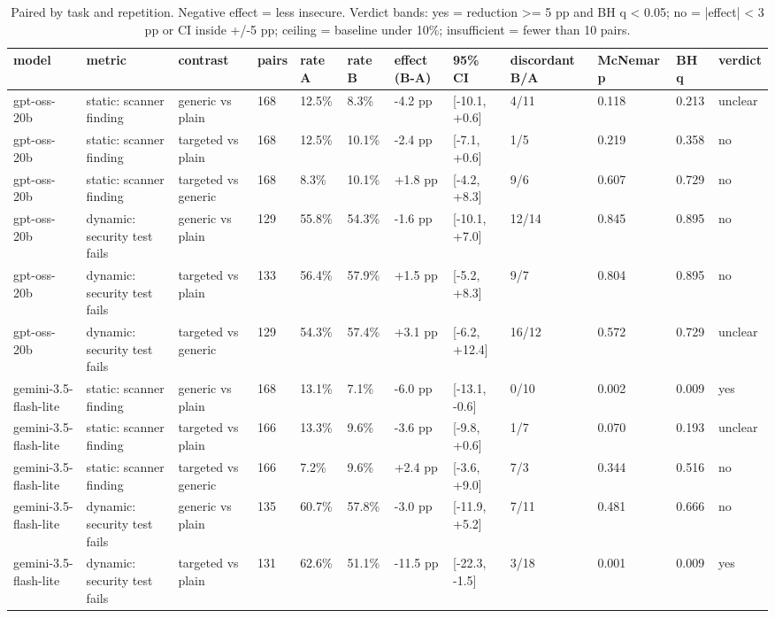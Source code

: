 \begin{table}[t]\centering\small
\caption{Paired by task and repetition. Negative effect = less insecure. Verdict bands: yes = reduction >= 5 pp and BH q < 0.05; no = |effect| < 3 pp or CI inside +/-5 pp; ceiling = baseline under 10\%; insufficient = fewer than 10 pairs.}
\begin{tabular}{llllllllllll}
\toprule
model & metric & contrast & pairs & rate A & rate B & effect (B-A) & 95\% CI & discordant B/A & McNemar p & BH q & verdict \\
\midrule
gpt-oss-20b & static: scanner finding & generic vs plain & 168 & 12.5\% & 8.3\% & -4.2 pp & [-10.1, +0.6] & 4/11 & 0.118 & 0.213 & unclear \\
gpt-oss-20b & static: scanner finding & targeted vs plain & 168 & 12.5\% & 10.1\% & -2.4 pp & [-7.1, +0.6] & 1/5 & 0.219 & 0.358 & no \\
gpt-oss-20b & static: scanner finding & targeted vs generic & 168 & 8.3\% & 10.1\% & +1.8 pp & [-4.2, +8.3] & 9/6 & 0.607 & 0.729 & no \\
gpt-oss-20b & dynamic: security test fails & generic vs plain & 129 & 55.8\% & 54.3\% & -1.6 pp & [-10.1, +7.0] & 12/14 & 0.845 & 0.895 & no \\
gpt-oss-20b & dynamic: security test fails & targeted vs plain & 133 & 56.4\% & 57.9\% & +1.5 pp & [-5.2, +8.3] & 9/7 & 0.804 & 0.895 & no \\
gpt-oss-20b & dynamic: security test fails & targeted vs generic & 129 & 54.3\% & 57.4\% & +3.1 pp & [-6.2, +12.4] & 16/12 & 0.572 & 0.729 & unclear \\
gemini-3.5-flash-lite & static: scanner finding & generic vs plain & 168 & 13.1\% & 7.1\% & -6.0 pp & [-13.1, -0.6] & 0/10 & 0.002 & 0.009 & yes \\
gemini-3.5-flash-lite & static: scanner finding & targeted vs plain & 166 & 13.3\% & 9.6\% & -3.6 pp & [-9.8, +0.6] & 1/7 & 0.070 & 0.193 & unclear \\
gemini-3.5-flash-lite & static: scanner finding & targeted vs generic & 166 & 7.2\% & 9.6\% & +2.4 pp & [-3.6, +9.0] & 7/3 & 0.344 & 0.516 & no \\
gemini-3.5-flash-lite & dynamic: security test fails & generic vs plain & 135 & 60.7\% & 57.8\% & -3.0 pp & [-11.9, +5.2] & 7/11 & 0.481 & 0.666 & no \\
gemini-3.5-flash-lite & dynamic: security test fails & targeted vs plain & 131 & 62.6\% & 51.1\% & -11.5 pp & [-22.3, -1.5] & 3/18 & 0.001 & 0.009 & yes \\

\end{tabular}
\end{table}
